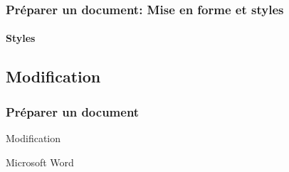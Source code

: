 \documentclass[xcolor=table]{beamer}
\begin{document}
\begin{frame}
\frametitle{Préparer un document: Mise en forme et styles}
\framesubtitle{Styles}

\begin{minipage}{0.58\textwidth}
\end{minipage}
\begin{minipage}{0.4\textwidth}
%
%
\end{minipage}

\end{frame}

\subsection{Modification}%

\begin{frame}
\frametitle{Préparer un document}

\begin{center}
	Modification 
	
	Microsoft Word
\end{center}

\end{frame}

%
%
%
\end{document}
